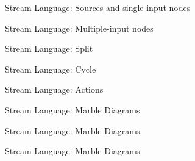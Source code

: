\documentclass{beamer}
\begin{document}
	\begin{frame}{Stream Language: Sources and single-input nodes}
	  \begin{minipage}{.5\textwidth}\centering
		\end{minipage}
		\hfill
		\begin{minipage}{.4\textwidth}\centering
		  
	  \end{minipage}
  \end{frame}
  \begin{frame}{Stream Language: Multiple-input nodes}
	  \begin{minipage}{.5\textwidth}\centering
		\end{minipage}
		\hfill
		\begin{minipage}{.4\textwidth}\centering
		  
	  \end{minipage}
	\end{frame}
  \begin{frame}{Stream Language: Split}
	  \begin{minipage}{.5\textwidth}\centering
		\end{minipage}
		\hfill
		\begin{minipage}{.4\textwidth}\centering
		  
	  \end{minipage}
	\end{frame}
	\begin{frame}{Stream Language: Cycle}
	  \begin{minipage}{.5\textwidth}\centering
		\end{minipage}
		\hfill
		\begin{minipage}{.4\textwidth}\centering
		  
	  \end{minipage}
	\end{frame}
	\begin{frame}{Stream Language: Actions}
	  \begin{minipage}{.5\textwidth}\centering
		\end{minipage}
		\hspace{1cm}
		\begin{minipage}{.3\textwidth}\centering
		  
	  \end{minipage}
	\end{frame}
	
	\begin{frame}{Stream Language: Marble Diagrams}
	  
    
  \end{frame}
  \begin{frame}{Stream Language: Marble Diagrams}
		
		
	\end{frame}
  \begin{frame}{Stream Language: Marble Diagrams}
		
		
	\end{frame}
	
\end{document}
